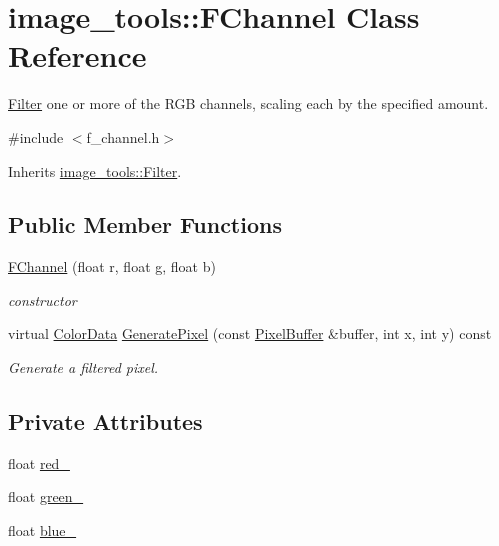\hypertarget{classimage__tools_1_1FChannel}{}\section{image\+\_\+tools\+:\+:F\+Channel Class Reference}
\label{classimage__tools_1_1FChannel}


\hyperlink{classimage__tools_1_1Filter}{Filter} one or more of the R\+GB channels, scaling each by the specified amount.  




{\ttfamily \#include $<$f\+\_\+channel.\+h$>$}



Inherits \hyperlink{classimage__tools_1_1Filter}{image\+\_\+tools\+::\+Filter}.

\subsection*{Public Member Functions}
\begin{DoxyCompactItemize}
\item 
\hyperlink{classimage__tools_1_1FChannel_a25ea559c6411f4dcdcfad511987688b0}{F\+Channel} (float r, float g, float b)\hypertarget{classimage__tools_1_1FChannel_a25ea559c6411f4dcdcfad511987688b0}{}\label{classimage__tools_1_1FChannel_a25ea559c6411f4dcdcfad511987688b0}

\begin{DoxyCompactList}\small\item\em constructor \end{DoxyCompactList}\item 
virtual \hyperlink{classimage__tools_1_1ColorData}{Color\+Data} \hyperlink{classimage__tools_1_1FChannel_a749ce0d7e3b50b69a73c97917eeb7d0b}{Generate\+Pixel} (const \hyperlink{classimage__tools_1_1PixelBuffer}{Pixel\+Buffer} \&buffer, int x, int y) const 
\begin{DoxyCompactList}\small\item\em Generate a filtered pixel. \end{DoxyCompactList}\end{DoxyCompactItemize}
\subsection*{Private Attributes}
\begin{DoxyCompactItemize}
\item 
float \hyperlink{classimage__tools_1_1FChannel_a6d2b5a5e5bffb3673df6191cf642f337}{red\+\_\+}
\item 
float \hyperlink{classimage__tools_1_1FChannel_a42ef11eef9bfad14df5007959047ccc6}{green\+\_\+}
\item 
float \hyperlink{classimage__tools_1_1FChannel_a3eb08bcf47005e1672b4516b0c75d7a9}{blue\+\_\+}
\end{DoxyCompactItemize}


